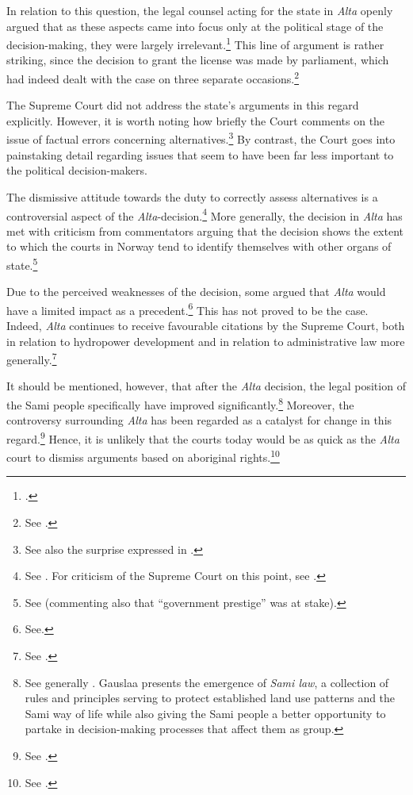 In relation to this question, the legal counsel acting for the state in {\it Alta} openly argued that as these aspects came into focus only at the political stage of the decision-making, they were largely irrelevant.\footcite[341]{alta82} This line of argument is rather striking, since the decision to grant the license was made by parliament, which had indeed dealt with the case on three separate occasions.\footnote{See \cite[342]{alta82}.}

The Supreme Court did not address the state's arguments in this regard explicitly. However, it is worth noting how briefly the Court comments on the issue of factual errors concerning alternatives.\footnote{See also the surprise expressed in \cite[349-351]{eckhoff82}.} By contrast, the Court goes into painstaking detail regarding issues that seem to have been far less important to the political decision-makers.


The dismissive attitude towards the duty to correctly assess alternatives is a controversial aspect of the {\it Alta}-decision.\footnote{See \cite[311]{haagensen02}. For criticism of the Supreme Court on this point, see \cite[580-584]{backer86}.} More generally, the decision in {\it Alta} has met with criticism from commentators arguing that the decision shows the extent to which the courts in Norway tend to identify themselves with other organs of state.\footnote{See \cite[64]{graver88} (commenting also that ``government prestige'' was at stake).} 

Due to the perceived weaknesses of the decision, some argued that {\it Alta} would have a limited impact as a precedent.\footnote{See\cite[580-584]{backer86}.} This has not proved to be the case. Indeed, {\it Alta} continues to receive favourable citations by the Supreme Court, both in relation to hydropower development and in relation to administrative law more generally.\footnote{See \cite{ambassade09,jorpeland11}.}

It should be mentioned, however, that after the {\it Alta} decision, the legal position of the Sami people specifically have improved significantly.\footnote{See generally \cite{gauslaa07}. Gauslaa presents the emergence of {\it Sami law}, a collection of rules and principles serving to protect established land use patterns and the Sami way of life while also giving the Sami people a better opportunity to partake in decision-making processes that affect them as group.} Moreover, the controversy surrounding {\it Alta} has been regarded as a catalyst for change in this regard.\footnote{See \cite[156]{ravna12s}.} Hence, it is unlikely that the courts today would be as quick as the {\it Alta} court to dismiss arguments based on aboriginal rights.\footnote{See \cite[180]{gauslaa07}.}

